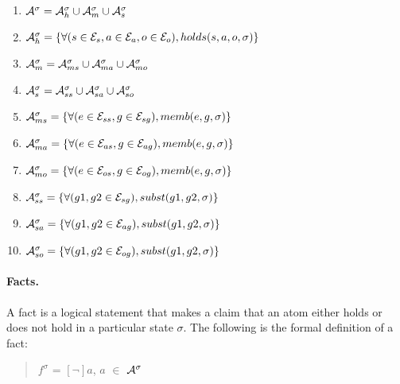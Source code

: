 \documentclass[10pt, twocolumn]{article}
\begin{document}
          \begin{enumerate}
            \item
              ${\cal A}^{\sigma} = {\cal A}^{\sigma}_{h} \cup {\cal A}^{\sigma}_{m} \cup {\cal A}^{\sigma}_{s}$
            \item
              ${\cal A}^{\sigma}_{h} = \{\forall (s \in {\cal E}_{s}, a \in {\cal E}_{a}, o \in {\cal E}_{o}), holds(s, a, o, \sigma) \}$
            \item
              ${\cal A}^{\sigma}_{m} = {\cal A}^{\sigma}_{ms} \cup {\cal A}^{\sigma}_{ma} \cup {\cal A}^{\sigma}_{mo}$
            \item
              ${\cal A}^{\sigma}_{s} = {\cal A}^{\sigma}_{ss} \cup {\cal A}^{\sigma}_{sa} \cup {\cal A}^{\sigma}_{so}$
            \item
              ${\cal A}^{\sigma}_{ms} = \{\forall (e \in {\cal E}_{ss}, g \in {\cal E}_{sg}), memb(e, g, \sigma)\}$
            \item
              ${\cal A}^{\sigma}_{ma} = \{\forall (e \in {\cal E}_{as}, g \in {\cal E}_{ag}), memb(e, g, \sigma)\}$
            \item
              ${\cal A}^{\sigma}_{mo} = \{\forall (e \in {\cal E}_{os}, g \in {\cal E}_{og}), memb(e, g, \sigma)\}$
            \item
              ${\cal A}^{\sigma}_{ss} = \{\forall (g1, g2 \in {\cal E}_{sg}), subst(g1, g2, \sigma)\}$
            \item
              ${\cal A}^{\sigma}_{sa} = \{\forall (g1, g2 \in {\cal E}_{ag}), subst(g1, g2, \sigma)\}$
            \item
              ${\cal A}^{\sigma}_{so} = \{\forall (g1, g2 \in {\cal E}_{og}), subst(g1, g2, \sigma)\}$
          \end{enumerate}

        \paragraph{Facts.}
       
          A fact is a logical statement that makes a claim that an atom either
          holds or does not hold in a particular state $\sigma$. The following
          is the formal definition of a fact:

          \begin{quote}
            $f^{\sigma}$ = $[\lnot]$$a$, $a$ $\in$ ${\cal A}^{\sigma}$
          \end{quote}
\end{document}
